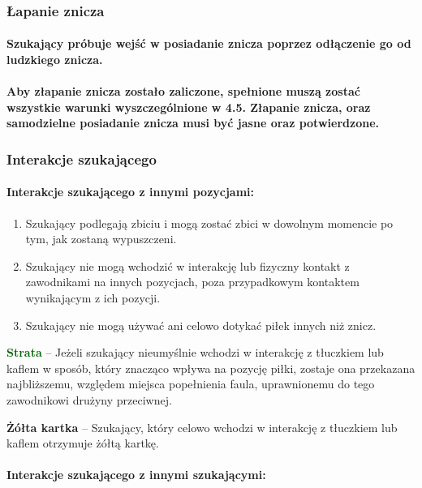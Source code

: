 \documentclass[12pt]{article}
\newcommand\yellowcard[1]{\bgroup\textcolor{darkyellow}{\textbf{#1}}}
\newcommand\other[1]{\bgroup\textcolor{darkgreen}{\textbf{#1}}}
\begin{document}
\subsubsection{Łapanie znicza}

\paragraph{Szukający próbuje wejść w posiadanie znicza poprzez
	odłączenie go od ludzkiego znicza.}

\paragraph{Aby złapanie znicza zostało zaliczone, spełnione muszą
	zostać wszystkie warunki wyszczególnione w 4.5. Złapanie znicza, oraz
	samodzielne posiadanie znicza musi być jasne oraz potwierdzone.}

\subsubsection{Interakcje szukającego}

\paragraph{Interakcje szukającego z innymi pozycjami: }

\begin{enumerate}
	\item
	      Szukający podlegają zbiciu i mogą zostać zbici w dowolnym momencie po
	      tym, jak zostaną wypuszczeni.
	\item
	      Szukający nie mogą wchodzić w interakcję lub fizyczny kontakt z
	      zawodnikami na innych pozycjach, poza przypadkowym kontaktem
	      wynikającym z ich pozycji.
	\item
	      Szukający nie mogą używać ani celowo dotykać piłek innych niż znicz.
\end{enumerate}

\other{Strata} -- Jeżeli szukający nieumyślnie wchodzi w interakcję z
tłuczkiem lub kaflem w sposób, który znacząco wpływa na pozycję piłki,
zostaje ona przekazana najbliższemu, względem miejsca popełnienia faula,
uprawnionemu do tego zawodnikowi drużyny przeciwnej.

\yellowcard{Żółta kartka} -- Szukający, który celowo wchodzi w interakcję z
tłuczkiem lub kaflem otrzymuje żółtą kartkę.

\paragraph{Interakcje szukającego z innymi szukającymi:}
\end{document}
